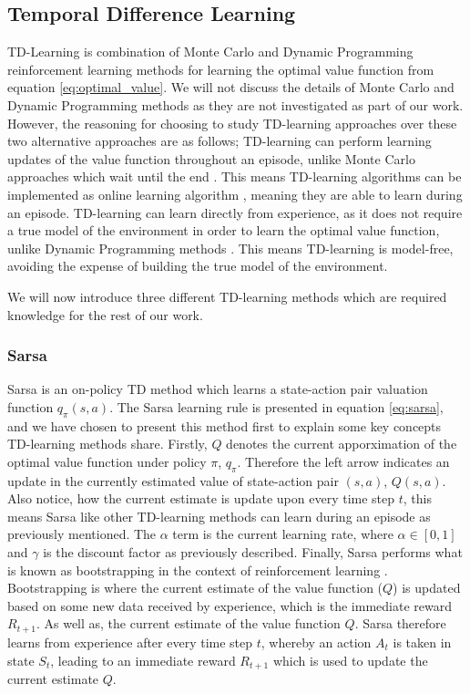 \documentclass[../dissertation.tex]{subfiles}
\begin{document}
\subsection{Temporal Difference Learning}
\label{sec:td_learning}

TD-Learning is combination of Monte Carlo and Dynamic Programming reinforcement learning methods for learning the optimal value function from equation \ref{eq:optimal_value}. We will not discuss the details of Monte Carlo and Dynamic Programming methods as they are not investigated as part of our work. However, the reasoning for choosing to study  TD-learning approaches over these two alternative approaches are as follows; TD-learning can perform learning updates of the value function throughout an episode, unlike Monte Carlo approaches which wait until the end \cite{model_free_prediction}. This means TD-learning algorithms can be implemented as online learning algorithm \cite{sutton2011reinforcement}, meaning they are able to learn during an episode. TD-learning can learn directly from experience, as it does not require a true model of the environment in order to learn the optimal value function, unlike Dynamic Programming methods \cite{mdp_dynamic_prog}. This means TD-learning is model-free, avoiding the expense of building the true model of the environment.

We will now introduce three different TD-learning methods which are required knowledge for the rest of our work.

\subsubsection*{Sarsa}

Sarsa is an on-policy TD method which learns a state-action pair valuation function $q_\pi(s,a)$. The Sarsa learning rule is presented in equation \ref{eq:sarsa}, and we have chosen to present this method first to explain some key concepts TD-learning methods share. Firstly, $Q$ denotes the current apporximation of the optimal value function under policy $\pi$, $q_\pi$. Therefore the left arrow indicates an update in the currently estimated value of state-action pair $(s,a)$, $Q(s,a)$. Also notice, how the current estimate is update upon every time step $t$, this means Sarsa like other TD-learning methods can learn during an episode as previously mentioned. The $\alpha$ term is the current learning rate, where $\alpha \in [0,1]$ and $\gamma$ is the discount factor as previously described. Finally, Sarsa performs what is known as bootstrapping in the context of reinforcement learning \cite{sutton2011reinforcement}. Bootstrapping is where the current estimate of the value function ($Q$) is updated based on some new data received by experience, which is the immediate reward $R_{t+1}$. As well as, the current estimate of the value function $Q$. Sarsa therefore learns from experience after every time step $t$, whereby an action $A_t$ is taken in state $S_{t}$, leading to an immediate reward $R_{t+1}$ which is used to update the current estimate $Q$.
\end{document}
